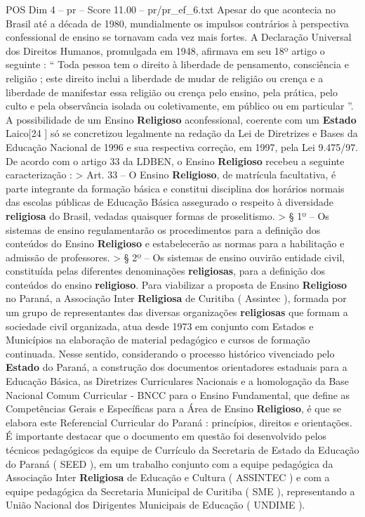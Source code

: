 \begin{textsample}{POS Dim 4 – pr – Score 11.00 – pr/pr\_ef\_6.txt}
Apesar do que acontecia no Brasil até a década de 1980, mundialmente os impulsos contrários à perspectiva confessional de ensino se tornavam cada vez mais fortes.
A Declaração Universal dos Direitos Humanos, promulgada em 1948, afirmava em seu 18º artigo o seguinte : “ Toda pessoa tem o direito à liberdade de pensamento, consciência e religião ; este direito inclui a liberdade de mudar de religião ou crença e a liberdade de manifestar essa religião ou crença pelo ensino, pela prática, pelo culto e pela observância isolada ou coletivamente, em público ou em particular ”.
A possibilidade de um Ensino \textbf{Religioso} aconfessional, coerente com um \textbf{Estado} Laico[24 ] só se concretizou legalmente na redação da Lei de Diretrizes e Bases da Educação Nacional de 1996 e sua respectiva correção, em 1997, pela Lei 9.475/97.
De acordo com o artigo 33 da LDBEN, o Ensino \textbf{Religioso} recebeu a seguinte caracterização : > Art. 33 – O Ensino \textbf{Religioso}, de matrícula facultativa, é parte integrante da formação básica e constitui disciplina dos horários normais das escolas públicas de Educação Básica assegurado o respeito à diversidade \textbf{religiosa} do Brasil, vedadas quaisquer formas de proselitismo. > § 1º – Os sistemas de ensino regulamentarão os procedimentos para a definição dos conteúdos do Ensino \textbf{Religioso} e estabelecerão as normas para a habilitação e admissão de professores. > § 2º – Os sistemas de ensino ouvirão entidade civil, constituída pelas diferentes denominações \textbf{religiosas}, para a definição dos conteúdos do ensino \textbf{religioso}.
Para viabilizar a proposta de Ensino \textbf{Religioso} no Paraná, a Associação Inter \textbf{Religiosa} de Curitiba ( Assintec ), formada por um grupo de representantes das diversas organizações \textbf{religiosas} que formam a sociedade civil organizada, atua desde 1973 em conjunto com Estados e Municípios na elaboração de material pedagógico e cursos de formação continuada.
Nesse sentido, considerando o processo histórico vivenciado pelo \textbf{Estado} do Paraná, a construção dos documentos orientadores estaduais para a Educação Básica, as Diretrizes Curriculares Nacionais e a homologação da Base Nacional Comum Curricular - BNCC para o Ensino Fundamental, que define as Competências Gerais e Específicas para a Área de Ensino \textbf{Religioso}, é que se elabora este Referencial Curricular do Paraná : princípios, direitos e orientações.
É importante destacar que o documento em questão foi desenvolvido pelos técnicos pedagógicos da equipe de Currículo da Secretaria de Estado da Educação do Paraná ( SEED ), em um trabalho conjunto com a equipe pedagógica da Associação Inter \textbf{Religiosa} de Educação e Cultura ( ASSINTEC ) e com a equipe pedagógica da Secretaria Municipal de Curitiba ( SME ), representando a União Nacional dos Dirigentes Municipais de Educação ( UNDIME ).

\end{textsample}
